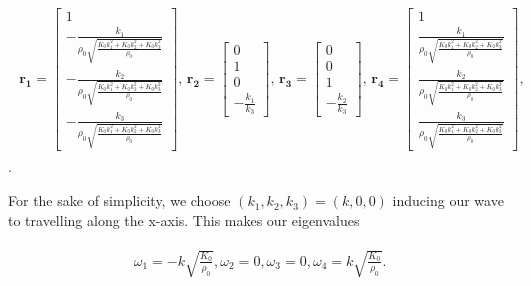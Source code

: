 \begin{align}
    \begin{split}
    \mathbf{r_1} = \begin{bmatrix}
        1 \\
-\frac{k_{1}}{\rho_{0} \sqrt{\frac{K_{0} k_{1}^{2} + K_{0} k_{2}^{2} + K_{0} k_{3}^{2}}{\rho_{0}}}} \\
-\frac{k_{2}}{\rho_{0} \sqrt{\frac{K_{0} k_{1}^{2} + K_{0} k_{2}^{2} + K_{0} k_{3}^{2}}{\rho_{0}}}} \\
-\frac{k_{3}}{\rho_{0} \sqrt{\frac{K_{0} k_{1}^{2} + K_{0} k_{2}^{2} + K_{0} k_{3}^{2}}{\rho_{0}}}}
        \end{bmatrix}, \,
        \mathbf{r_2} = \begin{bmatrix}
            0 \\
1 \\
0 \\
-\frac{k_{1}}{k_{3}}
            \end{bmatrix}, \,
            \mathbf{r_3} = \begin{bmatrix}
                0 \\
                0 \\
                1 \\
                -\frac{k_{2}}{k_{3}}
                \end{bmatrix}, \,
                \mathbf{r_4} = \begin{bmatrix}
                    1 \\
\frac{k_{1}}{\rho_{0} \sqrt{\frac{K_{0} k_{1}^{2} + K_{0} k_{2}^{2} + K_{0} k_{3}^{2}}{\rho_{0}}}} \\
\frac{k_{2}}{\rho_{0} \sqrt{\frac{K_{0} k_{1}^{2} + K_{0} k_{2}^{2} + K_{0} k_{3}^{2}}{\rho_{0}}}} \\
\frac{k_{3}}{\rho_{0} \sqrt{\frac{K_{0} k_{1}^{2} + K_{0} k_{2}^{2} + K_{0} k_{3}^{2}}{\rho_{0}}}}
                    \end{bmatrix},
    \end{split}
\end{align} .

For the sake of simplicity, we choose $\left(k_1,k_2,k_3\right) = \left(k,0,0\right)$ inducing our wave to travelling along the x-axis. This makes our eigenvalues

\begin{align}
    \begin{split}
        \omega_1 = -k \sqrt{\frac{K_{0}}{\rho_{0}}},
        \omega_2 = 0,
        \omega_3 = 0,
        \omega_4 = k \sqrt{\frac{K_{0}}{\rho_{0}}} .
    \end{split}
\end{align}

